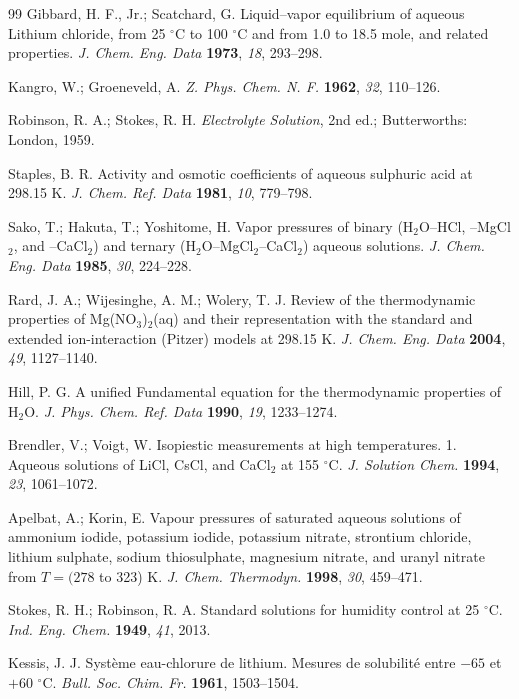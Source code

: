 \documentclass[11pt]{article}
\begin{document}
\begin{thebibliography}{99}
 Gibbard, H. F., Jr.; Scatchard, G. Liquid--vapor equilibrium
of aqueous Lithium chloride, from 25 $^{\circ}$C to 100 $^{\circ}$C and from
1.0 to 18.5 mole, and related properties. \textit{J. Chem. Eng. Data}
\textbf{1973}, \textit{18}, 293--298.

 Kangro, W.; Groeneveld, A. \textit{Z. Phys. Chem. N. F.}
\textbf{1962}, \textit{32}, 110--126.

 Robinson, R. A.; Stokes, R. H. \textit{Electrolyte Solution},
2nd ed.; Butterworths: London, 1959.

 Staples, B. R. Activity and osmotic coefficients of aqueous
sulphuric acid at 298.15 K. \textit{J. Chem. Ref. Data} \textbf{1981},
\textit{10}, 779--798.

 Sako, T.; Hakuta, T.; Yoshitome, H. Vapor pressures of binary
(H$_2$O--HCl, --MgCl$_2$, and --CaCl$_2$) and ternary
(H$_2$O--MgCl$_2$--CaCl$_2$) aqueous solutions. \textit{J. Chem. Eng. Data}
\textbf{1985}, \textit{30}, 224--228.

 Rard, J. A.; Wijesinghe, A. M.; Wolery, T. J. Review of the
thermodynamic properties of Mg(NO$_3$)$_2$(aq) and their representation with
the standard and extended ion-interaction (Pitzer) models at 298.15 K.
\textit{J. Chem. Eng. Data} \textbf{2004}, \textit{49}, 1127--1140.

 Hill, P. G. A unified Fundamental equation for the
thermodynamic properties of H$_2$O. \textit{J. Phys. Chem. Ref. Data}
\textbf{1990}, \textit{19}, 1233--1274.

 Brendler, V.; Voigt, W. Isopiestic measurements at high
temperatures. 1. Aqueous solutions of LiCl, CsCl, and CaCl$_2$ at
155 $^{\circ}$C. \textit{J. Solution Chem.} \textbf{1994}, \textit{23},
1061--1072.

 Apelbat, A.; Korin, E. Vapour pressures of saturated aqueous
solutions of ammonium iodide, potassium iodide, potassium nitrate, strontium
chloride, lithium sulphate, sodium thiosulphate, magnesium nitrate, and uranyl
nitrate from $T = (278$ to 323) K. \textit{J. Chem. Thermodyn.} \textbf{1998},
\textit{30}, 459--471.

 Stokes, R. H.; Robinson, R. A. Standard solutions for humidity
control at 25 $^{\circ}$C. \textit{Ind. Eng. Chem.} \textbf{1949},
\textit{41}, 2013.

 Kessis, J. J. Syst\`eme eau-chlorure de lithium. Mesures de
solubilit\'e entre $-65$ et $+60$ $^{\circ}$C. \textit{Bull. Soc. Chim. Fr.}
\textbf{1961}, 1503--1504.


\end{thebibliography}
\end{document}
